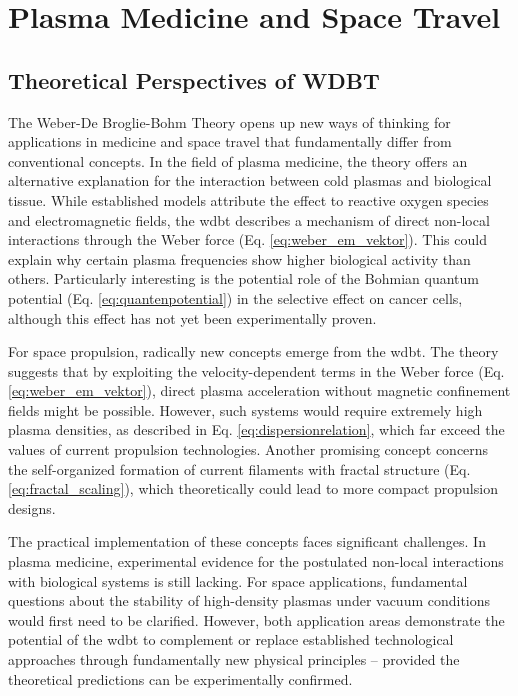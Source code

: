 \chapter{Plasma Medicine and Space Travel}
\section{Theoretical Perspectives of WDBT}
The Weber-De Broglie-Bohm Theory opens up new ways of thinking for applications in medicine and space travel that fundamentally differ from conventional concepts. In the field of plasma medicine, the theory offers an alternative explanation for the interaction between cold plasmas and biological tissue. While established models attribute the effect to reactive oxygen species and electromagnetic fields, the \gls{wdbt} describes a mechanism of direct non-local interactions through the Weber force (Eq. \ref{eq:weber_em_vektor}). This could explain why certain plasma frequencies show higher biological activity than others. Particularly interesting is the potential role of the Bohmian quantum potential (Eq. \ref{eq:quantenpotential}) in the selective effect on cancer cells, although this effect has not yet been experimentally proven.

For space propulsion, radically new concepts emerge from the \gls{wdbt}. The theory suggests that by exploiting the velocity-dependent terms in the Weber force (Eq. \ref{eq:weber_em_vektor}), direct plasma acceleration without magnetic confinement fields might be possible. However, such systems would require extremely high plasma densities, as described in Eq. \ref{eq:dispersionrelation}, which far exceed the values of current propulsion technologies. Another promising concept concerns the self-organized formation of current filaments with fractal structure (Eq. \ref{eq:fractal_scaling}), which theoretically could lead to more compact propulsion designs.

The practical implementation of these concepts faces significant challenges. In plasma medicine, experimental evidence for the postulated non-local interactions with biological systems is still lacking. For space applications, fundamental questions about the stability of high-density plasmas under vacuum conditions would first need to be clarified. However, both application areas demonstrate the potential of the \gls{wdbt} to complement or replace established technological approaches through fundamentally new physical principles – provided the theoretical predictions can be experimentally confirmed.